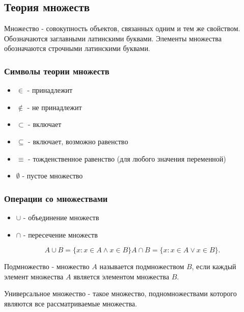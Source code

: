 \subsection{Теория множеств}

\begin{definition}
  Множество - совокупность объектов, связанных одним и тем же свойством. Обозначаются заглавными латинскими буквами. Элементы множества обозначаются строчными латинскими буквами.
\end{definition}

\subsubsection{Символы теории множеств}

\begin{itemize}
  \item $\in$ - принадлежит
  \item $\notin$ - не принадлежит
  \item $\subset$ - включает
  \item $\subseteq$ - включает, возможно равенство
  \item $\equiv$ - тожденственное равенство (для любого значения переменной)
  \item $\emptyset$ - пустое множество
\end{itemize}

\subsubsection{Операции со множествами}

\begin{itemize}
  \item $\cup$ - объединение множеств
  \item $\cap$ - пересечение множеств
\end{itemize}

\begin{note}
   \[
  A\cup B = \{ x : x\in A \land x\in B\} 
  A\cap B = \{x : x\in A \lor x\in B\} 
  .\] 
\end{note}

\begin{definition}
  Подмножество - множество $A$ называется подмножеством  $B$, если каждый элемент множества $A$ является элементом множества $B$.
\end{definition}

\begin{definition}
  Универсальное множество - такое множество, подномножествами которого являются все рассматриваемые множества.
\end{definition}

